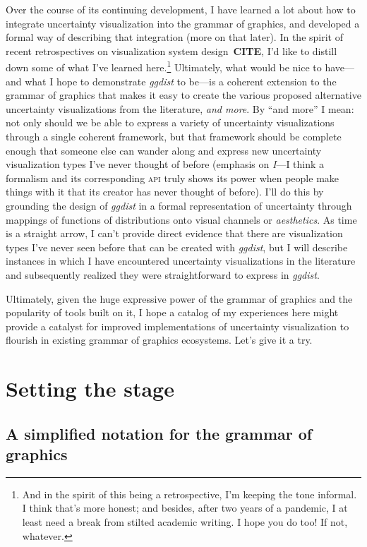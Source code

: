\documentclass[journal]{vgtc}                     %
\begin{document}
Over the course of its continuing development, I have learned a lot about how to integrate uncertainty visualization into the grammar of graphics, and developed a formal way of describing that integration (more on that later). In the spirit of recent retrospectives on visualization system design~\textbf{CITE}, I'd like to distill down some of what I've learned here.\footnote{And in the spirit of this being a retrospective, I'm keeping the tone informal. I think that's more honest; and besides, after two years of a pandemic, I at least need a break from stilted academic writing. I hope you do too! If not, whatever.} Ultimately, what would be nice to have---and what I hope to demonstrate \textit{ggdist} to be---is a coherent extension to the grammar of graphics that makes it easy to create the various proposed alternative uncertainty visualizations from the literature, \textit{and more}. By  ``and more'' I mean: not only should we be able to express a variety of uncertainty visualizations through a single coherent framework, but that framework should be complete enough that someone else can wander along and express new uncertainty visualization types I've never thought of before (emphasis on \textit{I}---I think a formalism and its corresponding \textsc{api} truly shows its power when people make things with it that its creator has never thought of before). I'll do this by grounding the design of \textit{ggdist} in a formal representation of uncertainty through mappings of functions of distributions onto visual channels or \textit{aesthetics}. As time is a straight arrow, I can't provide direct evidence that there are visualization types I've never seen before that can be created with \textit{ggdist}, but I will describe instances in which I have encountered uncertainty visualizations in the literature and subsequently realized they were straightforward to express in \textit{ggdist}.

Ultimately, given the huge expressive power of the grammar of graphics and the popularity of tools built on it, I hope a catalog of my experiences here might provide a catalyst for improved implementations of uncertainty visualization to flourish in existing grammar of graphics ecosystems. Let's give it a try.

\section{Setting the stage}

\subsection{A simplified notation for the grammar of graphics}
\end{document}
